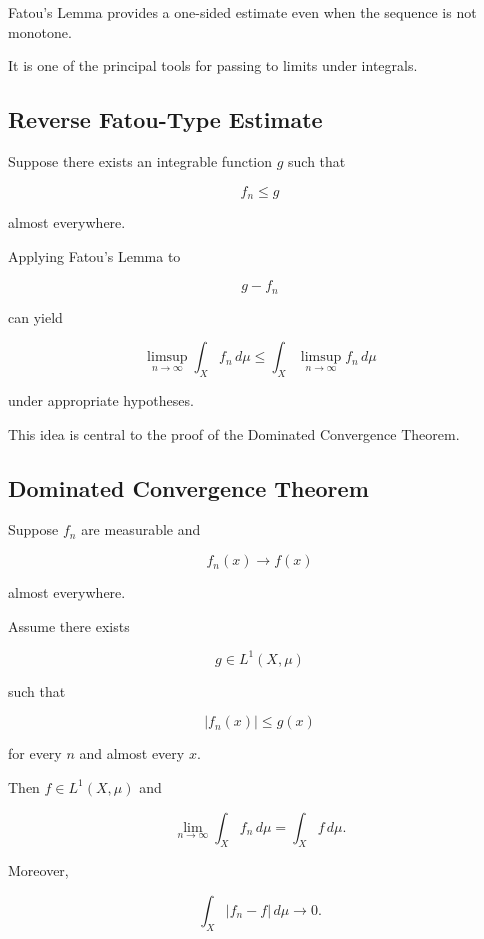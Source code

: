 Fatou's Lemma provides a one-sided estimate even when the sequence is not
monotone.

It is one of the principal tools for passing to limits under integrals.

\subsection{Reverse Fatou-Type Estimate}
\label{subsec:reverse-fatou}

Suppose there exists an integrable function \(g\) such that

\[
f_n\leq g
\]

almost everywhere.

Applying Fatou's Lemma to

\[
g-f_n
\]

can yield

\[
\boxed{
\limsup_{n\to\infty}
\int_Xf_n\,d\mu
\leq
\int_X
\limsup_{n\to\infty}f_n\,d\mu
}
\]

under appropriate hypotheses.

This idea is central to the proof of the Dominated Convergence Theorem.

\subsection{Dominated Convergence Theorem}
\label{subsec:dominated-convergence-theorem}

\begin{theorem}
Suppose \(f_n\) are measurable and

\[
f_n(x)\to f(x)
\]

almost everywhere.

Assume there exists

\[
g\in L^1(X,\mu)
\]

such that

\[
\boxed{
|f_n(x)|\leq g(x)
}
\]

for every \(n\) and almost every \(x\).

Then \(f\in L^1(X,\mu)\) and

\[
\boxed{
\lim_{n\to\infty}
\int_Xf_n\,d\mu
=
\int_Xf\,d\mu.
}
\]

Moreover,

\[
\boxed{
\int_X|f_n-f|\,d\mu\to0.
}
\]
\end{theorem}

